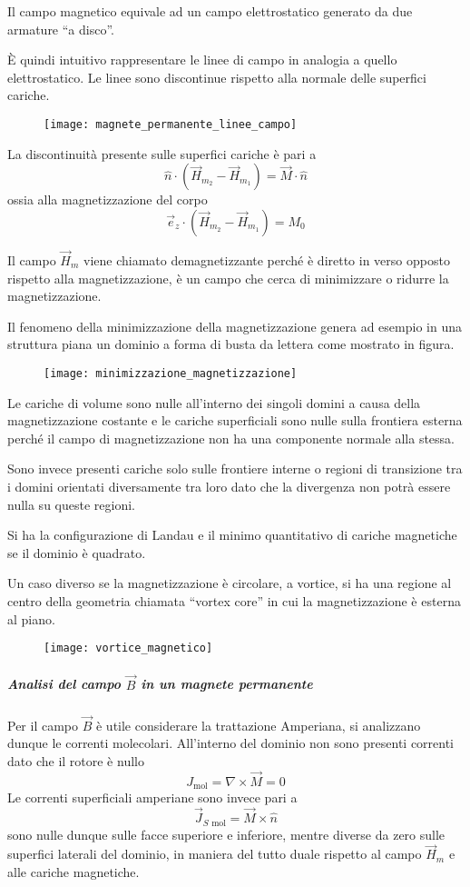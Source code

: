 Il campo magnetico equivale ad un campo elettrostatico generato da due 
armature ``a disco''.

È quindi intuitivo rappresentare le linee di campo in analogia a quello elettrostatico.
Le linee sono discontinue rispetto alla normale delle superfici cariche.
\begin{figure}[H]
\centering
\texttt{[image: magnete\_permanente\_linee\_campo]}
\end{figure}

La discontinuità presente sulle superfici cariche è pari a
$$
\hat{n}\cdot\left(\vec{H}_{m_2}-\vec{H}_{m_1}\right) = \vec{M}\cdot\hat{n}
$$
ossia alla magnetizzazione del corpo
$$
\vec{e}_z \cdot \left(\vec{H}_{m_2}-\vec{H}_{m_1}\right) = M_0
$$

Il campo $\vec{H}_m$ viene chiamato demagnetizzante perché è diretto in verso opposto
rispetto alla magnetizzazione, è un campo che cerca di minimizzare o ridurre la 
magnetizzazione.

Il fenomeno della minimizzazione della magnetizzazione genera ad esempio in una struttura
piana un dominio a forma di busta da lettera come mostrato in figura.
\begin{figure}[H]
\centering
\texttt{[image: minimizzazione\_magnetizzazione]}
\end{figure}
Le cariche di volume sono nulle all'interno dei singoli domini a causa
della magnetizzazione costante e le cariche superficiali sono nulle
sulla frontiera esterna perché il campo di magnetizzazione non ha una componente
normale alla stessa.

Sono invece presenti cariche solo sulle frontiere interne o regioni di transizione
tra i domini orientati diversamente tra loro dato che la divergenza non potrà essere
nulla su queste regioni.

Si ha la configurazione di Landau e il minimo quantitativo di cariche magnetiche se il 
dominio è quadrato.

Un caso diverso se la magnetizzazione è circolare, a vortice, si ha una regione al centro 
della geometria chiamata ``vortex core'' in cui la magnetizzazione è esterna al piano.
\begin{figure}[H]
\centering
\texttt{[image: vortice\_magnetico]}
\end{figure}
\newpage

\subparagraph{Analisi del campo $\vec{B}$ in un magnete permanente}
Per il campo $\vec{B}$ è utile considerare la trattazione Amperiana, si analizzano dunque
le correnti molecolari.
All'interno del dominio non sono presenti correnti dato che il rotore è nullo
$$
J_{\text{mol}} = \nabla\times\vec{M} = 0
$$
Le correnti superficiali amperiane sono invece pari a 
$$
\vec{J}_{S\text{ mol}} = \vec{M}\times\hat{n}
$$
sono nulle dunque sulle facce superiore e inferiore, mentre diverse da zero sulle superfici
laterali del dominio, in maniera del tutto duale rispetto al campo $\vec{H}_m$ e 
alle cariche magnetiche.

